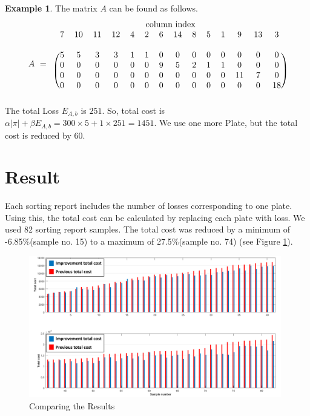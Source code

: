 \documentclass[a4paper]{amsart}
\numberwithin{equation}{section} %
\numberwithin{figure}{section} %
\numberwithin{table}{section}
\theoremstyle{plain}
\theoremstyle{definition}
\newtheorem{example}[thm]{Example}
\theoremstyle{plain}
\theoremstyle{plain}
\theoremstyle{plain}
\theoremstyle{plain}
\theoremstyle{plain}
\begin{document}
\begin{example}
\noindent	
The matrix $A$ can be found as follows.
\begin{equation*}
\begin{array}{rc}
&\text{column index}\\
A\,\,=&
\begin{blockarray}{cccccccccccccc}
7 & 10 & 11 & 12 & 4 & 2 & 6 & 14 & 8 & 5 & 1 & 9 & 13 & 3\\
&&&&&&&&&&&&&\\
\begin{block}{(cccccccccccccc)}
5 & 5 & 3 & 3 & 1 & 1 & 0 & 0 & 0 & 0 & 0 & 0 & 0 & 0 \\
0 & 0 & 0 & 0 & 0 & 0 & 9 & 5 & 2 & 1 & 1 & 0 & 0 & 0 \\
0 & 0 & 0 & 0 & 0 & 0 & 0 & 0 & 0 & 0 & 0 & 11& 7 & 0 \\
0 & 0 & 0 & 0 & 0 & 0 & 0 & 0 & 0 & 0 & 0 & 0 & 0 & 18\\
\end{block}
\end{blockarray}
\end{array}
\end{equation*}
\noindent
The total Loss $E_{A,b}$ is $251$. So, total cost is $\alpha|\pi|+\beta E_{A,b}=300 \times 5+1 \times 251 =1451$. We use one more Plate, but the total cost is reduced by $60$.
	

	
\end{example}



\section{Result}\label{sec:Result}

Each sorting report includes the number of losses corresponding to one plate. 
Using this, the total cost can be calculated by replacing each plate with loss. 
We used 82 sorting report samples.
The total cost was reduced by a minimum of -6.85\%(sample no. 15) to a maximum of 27.5\%(sample no. 74) (see Figure \ref{fig:Comparing}).

\begin{figure}[h!]
	\centering
	\includegraphics[width=11cm]{Graph_2.pdf}
	\caption{Comparing the Results}
	\label{fig:Comparing}       %
\end{figure}
\end{document}
